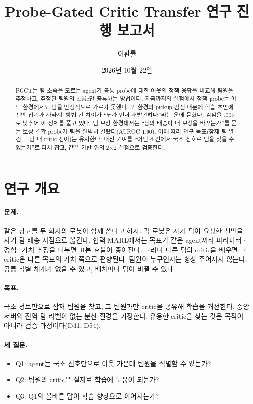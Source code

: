 \documentclass[11pt]{article}
\title{Probe-Gated Critic Transfer 연구 진행 보고서}
\author{이환률}
\date{2026년 10월 22일}
\begin{document}
\maketitle

\begin{abstract}
PGCT는 팀 소속을 모르는 agent가 공통 probe에 대한 이웃의 정책 응답을 비교해 팀원을 추정하고, 추정된 팀원의 critic만 증류하는 방법이다.
지금까지의 실험에서 정책 probe는 어느 환경에서도 팀을 안정적으로 가르지 못했다.
또 환경의 pickup 감점 때문에 학습 초반에 선반 집기가 사라져, 방법 간 차이가 ``누가 먼저 재발견하나''라는 운에 묻혔다.
감점을 .005로 낮추어 이 정체를 풀고 있다.
팀 보상 환경에서는 ``남의 배송이 내 보상을 바꾸는가''를 묻는 보상 결합 probe가 팀을 완벽히 갈랐다(AUROC 1.00).
이에 따라 연구 목표(잠재 팀 발견 + 팀 내 critic 전이)는 유지한다.
대신 기여를 ``어떤 조건에서 국소 신호로 팀을 찾을 수 있는가''로 다시 잡고, 같은 기반 위의 2$\times$2 실험으로 검증한다.
\end{abstract}

\tableofcontents

\section{연구 개요}

\paragraph{문제.} 같은 창고를 두 회사의 로봇이 함께 쓴다고 하자. 각 로봇은 자기 팀이 요청한 선반을 자기 팀 배송 지점으로 옮긴다.
협력 MARL에서는 목표가 같은 agent끼리 파라미터·경험·가치 추정을 나누면 표본 효율이 좋아진다.
그러나 다른 팀의 critic을 배우면 그 critic은 다른 목표의 가치 쪽으로 편향된다.
팀원이 누구인지는 항상 주어지지 않는다. 공통 식별 체계가 없을 수 있고, 배치마다 팀이 바뀔 수 있다.

\paragraph{목표.} 국소 정보만으로 잠재 팀원을 찾고, 그 팀원과만 critic을 공유해 학습을 개선한다.
중앙 서버와 전역 팀 라벨이 없는 분산 환경을 가정한다. 유용한 critic을 찾는 것은 목적이 아니라 검증 과정이다(D41, D54).

\paragraph{세 질문.}
\begin{itemize}
  \item Q1: agent는 국소 신호만으로 이웃 가운데 팀원을 식별할 수 있는가?
  \item Q2: 팀원의 critic은 실제로 학습에 도움이 되는가?
  \item Q3: Q1의 올바른 답이 학습 향상으로 이어지는가?
\end{itemize}
\end{document}
